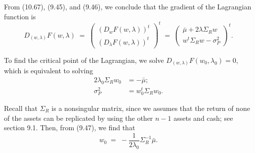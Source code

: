From (10.67), (9.45), and (9.46), we conclude that the gradient of the Lagrangian
function is
\[
D_{(w,\lambda)}F(w,\lambda) \;=\;
\begin{pmatrix} (D_wF(w,\lambda))^t \\ (D_\lambda F(w,\lambda))^t \end{pmatrix}^t
\;=\;
\begin{pmatrix} \bar\mu+2\lambda\Sigma_Rw \\ w^t\Sigma_Rw-\sigma_P^2 \end{pmatrix}^t.
\]

To find the critical point of the Lagrangian, we solve $D_{(w,\lambda)}F(w_0,\lambda_0)
= 0$, which is equivalent to solving
\begin{align}
2\lambda_0\Sigma_Rw_0 &= -\bar\mu; \\
\sigma_P^2 &= w_0^t\Sigma_Rw_0.
\end{align}

Recall that $\Sigma_R$ is a nonsingular matrix, since we assumes that the return of
none of the assets can be replicated by using the other $n-1$ assets and cash; see
section 9.1. Then, from (9.47), we find that
\begin{equation}
w_0 \;=\; -\frac{1}{2\lambda_0}\Sigma_R^{-1}\bar\mu.
\end{equation}
